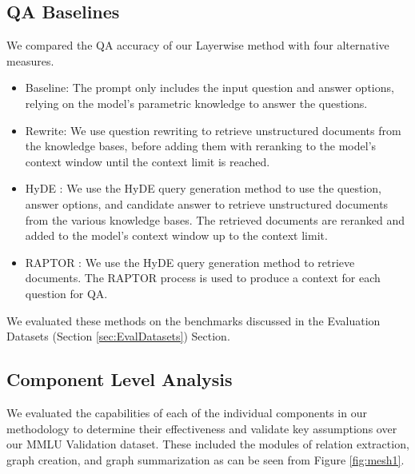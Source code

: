 \documentclass[11pt]{article}
\theoremstyle{definition}
\begin{document}
\subsection{QA Baselines}
We compared the QA accuracy of our Layerwise method with four alternative measures.
\begin{itemize}[noitemsep,leftmargin=*]
    \item Baseline: The prompt only includes the input question and answer options, relying on the model's parametric knowledge to answer the questions.
    \item Rewrite: We use question rewriting to retrieve unstructured documents from the knowledge bases, before adding them with reranking to the model's context window until the context limit is reached.
    \item HyDE \cite{gao-etal-2023-precise}: We use the HyDE query generation method to use the question, answer options, and candidate answer to retrieve unstructured documents from the various knowledge bases. The retrieved documents are reranked and added to the model's context window up to the context limit.
    \item RAPTOR \cite{DBLP:conf/iclr/SarthiATKGM24}: We use the HyDE query generation method to retrieve documents. The RAPTOR process is used to produce a context for each question for QA.
\end{itemize}
We evaluated these methods on the benchmarks discussed in the Evaluation Datasets (Section \ref{sec:EvalDatasets}) Section.

\subsection{Component Level Analysis}
We evaluated the capabilities of each of the individual components in our methodology to determine their effectiveness and validate key assumptions over our MMLU Validation dataset. These included the modules of relation extraction, graph creation, and graph summarization as can be seen from Figure \ref{fig:mesh1}. 
\\
\end{document}
